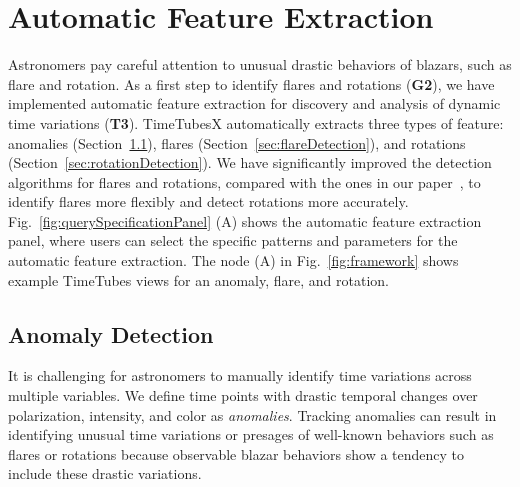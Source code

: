 \section{Automatic Feature Extraction}\label{sec:automaticExtraction}
Astronomers pay careful attention to unusual drastic behaviors of blazars, such as flare and rotation.
As a first step to identify flares and rotations (\textbf{G2}),
we have implemented automatic feature extraction for discovery and analysis of dynamic time variations (\textbf{T3}).
TimeTubesX automatically extracts three types of feature: anomalies (Section~\ref{sec:anomalyDetection}), flares (Section~\ref{sec:flareDetection}), and rotations (Section~\ref{sec:rotationDetection}).
We have significantly improved the detection algorithms for flares and rotations, compared with the ones in our paper~\cite{Sawada2018}, 
to identify flares more flexibly and detect rotations more accurately.
Fig.~\ref{fig:querySpecificationPanel} (A) shows the automatic feature extraction panel, %
where users can select the specific patterns and parameters for the automatic feature extraction.
The node (A) in Fig.~\ref{fig:framework} shows example TimeTubes views for an anomaly, flare, and rotation.

\subsection{Anomaly Detection}\label{sec:anomalyDetection}
It is challenging for astronomers to manually identify time variations across multiple variables. 
We define time points with drastic temporal changes over polarization, intensity, and color as \textit{anomalies}.
Tracking anomalies can result in identifying unusual time variations or presages of well-known behaviors such as flares or rotations
because observable blazar behaviors show a tendency to include these drastic variations.

